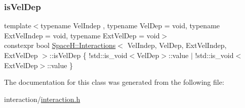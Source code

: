 \subsubsection{\texorpdfstring{is\+Vel\+Dep}{isVelDep}}
{\footnotesize\ttfamily template$<$typename Vel\+Indep , typename Vel\+Dep  = void, typename Ext\+Vel\+Indep  = void, typename Ext\+Vel\+Dep  = void$>$ \\
constexpr bool \mbox{\hyperlink{class_space_h_1_1_interactions}{Space\+H\+::\+Interactions}}$<$ Vel\+Indep, Vel\+Dep, Ext\+Vel\+Indep, Ext\+Vel\+Dep $>$\+::is\+Vel\+Dep \{ !std\+::is\+\_\+void$<$Vel\+Dep$>$\+::value $\vert$ !std\+::is\+\_\+void$<$Ext\+Vel\+Dep$>$\+::value \}\hspace{0.3cm}{\ttfamily [static]}}



The documentation for this class was generated from the following file\+:\begin{DoxyCompactItemize}
\item 
interaction/\mbox{\hyperlink{interaction_8h}{interaction.\+h}}\end{DoxyCompactItemize}
